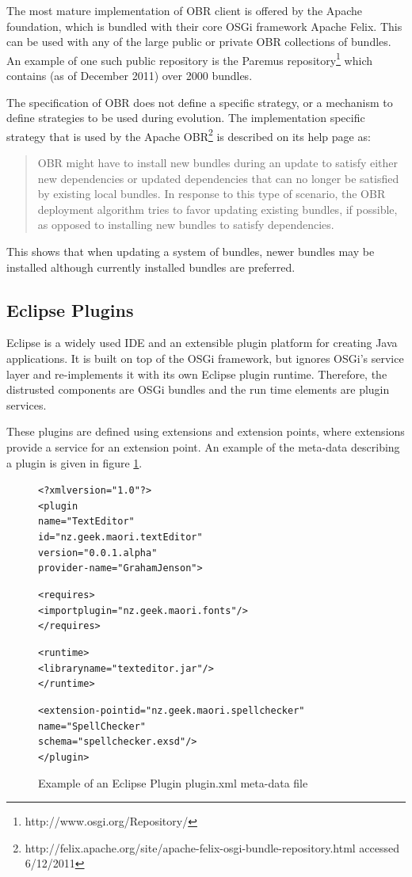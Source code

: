 The most mature implementation of OBR client is offered by the Apache foundation, which is bundled with their core OSGi framework Apache Felix. 
This can be used with any of the large public or private OBR collections of bundles.
An example of one such public repository is the Paremus repository\footnote{http://www.osgi.org/Repository/} which contains (as of December 2011) over 2000 bundles.

The specification of OBR does not define a specific strategy, or a mechanism to define strategies to be used during evolution.
The implementation specific strategy that is used by the Apache OBR\footnote{http://felix.apache.org/site/apache-felix-osgi-bundle-repository.html accessed 6/12/2011} 
is described on its help page as:

\begin{quotation}
OBR might have to install new bundles during an update to satisfy either new dependencies or updated dependencies that can no longer be satisfied by existing local bundles. 
In response to this type of scenario, the OBR deployment algorithm tries to favor updating existing bundles, if possible, as opposed to installing new bundles to satisfy dependencies.
\end{quotation}

This shows that when updating a system of bundles, newer bundles may be installed although currently installed bundles are preferred.

\subsection{Eclipse Plugins}
Eclipse is a widely used IDE and an extensible plugin platform for creating Java applications.
It is built on top of the OSGi framework, but ignores OSGi's service layer and re-implements it with its own Eclipse plugin runtime.
Therefore, the distrusted components are OSGi bundles and the run time elements are plugin services.

These plugins are defined using extensions and extension points, where extensions provide a service for an extension point.
An example of the meta-data describing a plugin is given in figure \ref{eclipseplugin}. 

\begin{figure}[htp]
\begin{center}
\begin{alltt}
<?xml version="1.0"?>
<plugin
    name="Text Editor"
    id="nz.geek.maori.textEditor"
    version="0.0.1.alpha"
    provider-name="Graham Jenson">
    
    <requires>
        <import plugin="nz.geek.maori.fonts"/>
    </requires>

    <runtime>
        <library name="texteditor.jar"/>
    </runtime>
    
    <extension-point id="nz.geek.maori.spellchecker" 
        name="Spell Checker" 
        schema="spellchecker.exsd"/>
</plugin>
\end{alltt}
  \caption[Eclipse Plugin meta-data]{Example of an Eclipse Plugin plugin.xml meta-data file}
  \label{eclipseplugin}
\end{center}
\end{figure}


